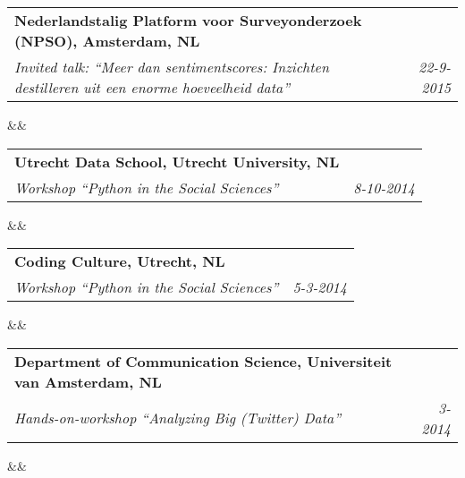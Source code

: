 \documentclass[11pt,a4paper,sans]{moderncv}
\makeatletter
\renewcommand*{\cventry}[7][.25em]{
	\begin{tabular*}{\textwidth}{p{13cm}@{\extracolsep{\fill}}r}%
		{\bfseries #4} & {\bfseries #5} \\%
		{\itshape #3\ifthenelse{\equal{#6}{}}{}{, #6}} & {\itshape #2}\\%
	\end{tabular*}%
	\ifx&#7&%
	\else{\\\vbox{\small#7}}\fi%
        \par\addvspace{#1}}
\makeatother
\begin{document}
 \cventry{22-9-2015}{Invited talk: ``Meer dan sentimentscores: Inzichten destilleren uit een enorme hoeveelheid data''}{Nederlandstalig Platform voor Surveyonderzoek (NPSO), Amsterdam, NL}{}{}{}

\cventry{8-10-2014 }{Workshop ``Python in the Social Sciences''}{Utrecht Data School, Utrecht University, NL}{}{}{}

\cventry{5-3-2014}{Workshop ``Python in the Social Sciences''}{Coding Culture, Utrecht, NL}{}{}{}

\cventry{3-2014}{Hands-on-workshop ``Analyzing Big (Twitter) Data''}{Department of Communication Science, Universiteit van Amsterdam, NL}{}{}{}
 




\end{document}
